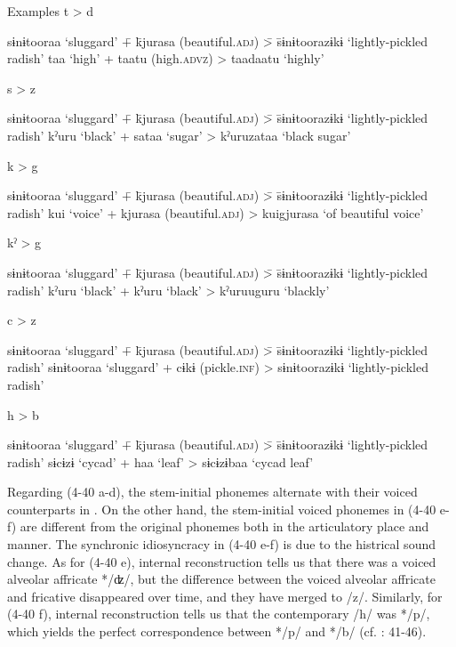 \ea  Examples \label{ex:4.40}
\ea\label{ex:4.40a}  t > d \\
    \begin{tabbing} sɨnɨtooraa ‘sluggard’ \= + \= kjurasa (beautiful.\textsc{adj}) \= > \= sɨnɨtoorazɨkɨ ‘lightly-pickled radish’\kill
    taa  ‘high’ \> + \> taatu  (high.\textsc{advz}) \> > \> taadaatu  ‘highly’
    \end{tabbing}
\ex\label{ex:4.40b}  s > z \\
    \begin{tabbing} sɨnɨtooraa ‘sluggard’ \= + \= kjurasa (beautiful.\textsc{adj}) \= > \= sɨnɨtoorazɨkɨ ‘lightly-pickled radish’\kill
    kˀuru  ‘black’ \> + \> sataa  ‘sugar’ \> > \> kˀuruzataa  ‘black sugar’
    \end{tabbing}
\ex\label{ex:4.40c} k > g \\
    \begin{tabbing} sɨnɨtooraa ‘sluggard’ \= + \= kjurasa (beautiful.\textsc{adj}) \= > \= sɨnɨtoorazɨkɨ ‘lightly-pickled radish’\kill
    kui  ‘voice’ \> + \> kjurasa  (beautiful.\textsc{adj}) \> > \> kuigjurasa  ‘of beautiful voice’
    \end{tabbing}
\ex\label{ex:4.40d} kˀ > g\\
    \begin{tabbing} sɨnɨtooraa ‘sluggard’ \= + \= kjurasa (beautiful.\textsc{adj}) \= > \= sɨnɨtoorazɨkɨ ‘lightly-pickled radish’\kill
    kˀuru  ‘black’ \> + \> kˀuru  ‘black’ \> > \> kˀuruuguru  ‘blackly’
    \end{tabbing}

\ex\label{ex:4.40e} c > z \\
    \begin{tabbing} sɨnɨtooraa ‘sluggard’ \= + \= kjurasa (beautiful.\textsc{adj}) \= > \= sɨnɨtoorazɨkɨ ‘lightly-pickled radish’\kill
    sɨnɨtooraa  ‘sluggard’ \> + \> cɨkɨ  (pickle.\textsc{inf}) \> > \> sɨnɨtoorazɨkɨ  ‘lightly-pickled radish’
    \end{tabbing}

\ex\label{ex:4.40f} h > b \\
    \begin{tabbing} sɨnɨtooraa ‘sluggard’ \= + \= kjurasa (beautiful.\textsc{adj}) \= > \= sɨnɨtoorazɨkɨ ‘lightly-pickled radish’\kill
    sɨcɨzɨ  ‘cycad’ \> + \> haa  ‘leaf’ \> > \> sɨcɨzɨbaa  ‘cycad leaf’
    \end{tabbing}
    \z
\z

Regarding (4-40 a-d), the stem-initial phonemes alternate with their voiced counterparts in . On the other hand, the stem-initial voiced phonemes in (4-40 e-f) are different from the original phonemes both in the articulatory place and manner. The synchronic idiosyncracy in (4-40 e-f) is due to the histrical sound change. As for (4-40 e), internal reconstruction tells us that there was a voiced alveolar affricate */ʣ/, but the difference between the voiced alveolar affricate and fricative disappeared over time, and they have merged to /z/. Similarly, for (4-40 f), internal reconstruction tells us that the contemporary /h/ was */p/, which yields the perfect correspondence between */p/ and */b/ (cf. \citealt{Ueda1898}: 41-46).

